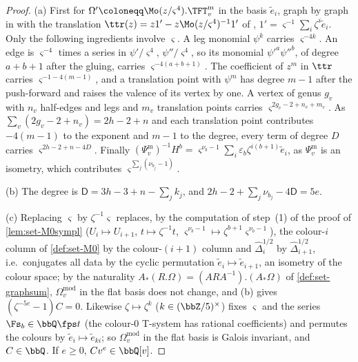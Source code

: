 \begin{proof}
(a) First for $\Omega'\coloneqq\Mo(z/\varsigma^4).\TFT^{\mathrm m}_v$ in the basis $\tilde e_i$, graph by graph in \cite[Def.~2.2]{PPZ15} with the translation $\ttr(z)=z1'-z\Mo(z/\varsigma^4)^{-1}1'$ of \cite[Def.~2.13]{PPZ15}, $1'=\varsigma^{-1}\sum_i\zeta^i\tilde e_i$. Only the following ingredients involve $\varsigma$. A leg monomial $\psi^k$ carries $\varsigma^{-4k}$. An edge is $\varsigma^{-4}$ times a series in $\psi'/\varsigma^4$, $\psi''/\varsigma^4$, so its monomial $\psi'^a\psi''^b$, of degree $a+b+1$ after the gluing, carries $\varsigma^{-4(a+b+1)}$. The coefficient of $z^m$ in $\ttr$ carries $\varsigma^{-1-4(m-1)}$, and a translation point with $\psi^m$ has degree $m-1$ after the push-forward and raises the valence of its vertex by one. A vertex of genus $g_v$ with $n_v$ half-edges and legs and $m_v$ translation points carries $\varsigma^{2g_v-2+n_v+m_v}$. As $\sum_v(2g_v-2+n_v)=2h-2+n$ and each translation point contributes $-4(m-1)$ to the exponent and $m-1$ to the degree, every term of degree $D$ carries $\varsigma^{2h-2+n-4D}$. Finally $(\Psi^{\mathrm m}_v)^{-1}H^b=\varsigma^{\nu_b-1}\sum_i\varepsilon_b\zeta^{i(b+1)}\tilde e_i$, as $\Psi^{\mathrm m}_v$ is an isometry, which contributes $\varsigma^{\sum_j(\nu_{b_j}-1)}$.

(b) The degree is $\mathsf D=3h-3+n-\sum_jk_j$, and $2h-2+\sum_j\nu_{b_j}-4\mathsf D=5e$.

(c) Replacing $\varsigma$ by $\zeta^{-1}\varsigma$ replaces, by the computation of step~(1) of the proof of \cref{lem:set-M0sympl} ($U_i\mapsto U_{i+1}$, $t\mapsto\zeta^{-1}t$, $\varsigma^{\nu_b-1}\mapsto\zeta^{b+1}\varsigma^{\nu_b-1}$), the colour-$i$ column of \cref{def:set-M0} by the colour-$(i+1)$ column and $\hat\Delta_i^{1/2}$ by $\hat\Delta_{i+1}^{1/2}$, i.e.\ conjugates all data by the cyclic permutation $\tilde e_i\mapsto\tilde e_{i+1}$, an isometry of the colour space; by the naturality $A_*(R.\Omega)=(ARA^{-1}).(A_*\Omega)$ of \cref{def:set-graphsum}, $\Omega^{\mathrm{mod}}_v$ in the flat basis does not change, and (b) gives $(\zeta^{-5e}-1)C=0$. Likewise $\zeta\mapsto\zeta^k$ ($k\in(\bbZ/5)^\times$) fixes $\varsigma$ and the series $\Fs_b\in\bbQ\fps t$ (the colour-$0$ T-system has rational coefficients) and permutes the colours by $\tilde e_i\mapsto\tilde e_{ki}$; so $\Omega^{\mathrm{mod}}_v$ in the flat basis is Galois invariant, and $C\in\bbQ$. If $e\geq0$, $Cv^e\in\bbQ[v]$.
\end{proof}


